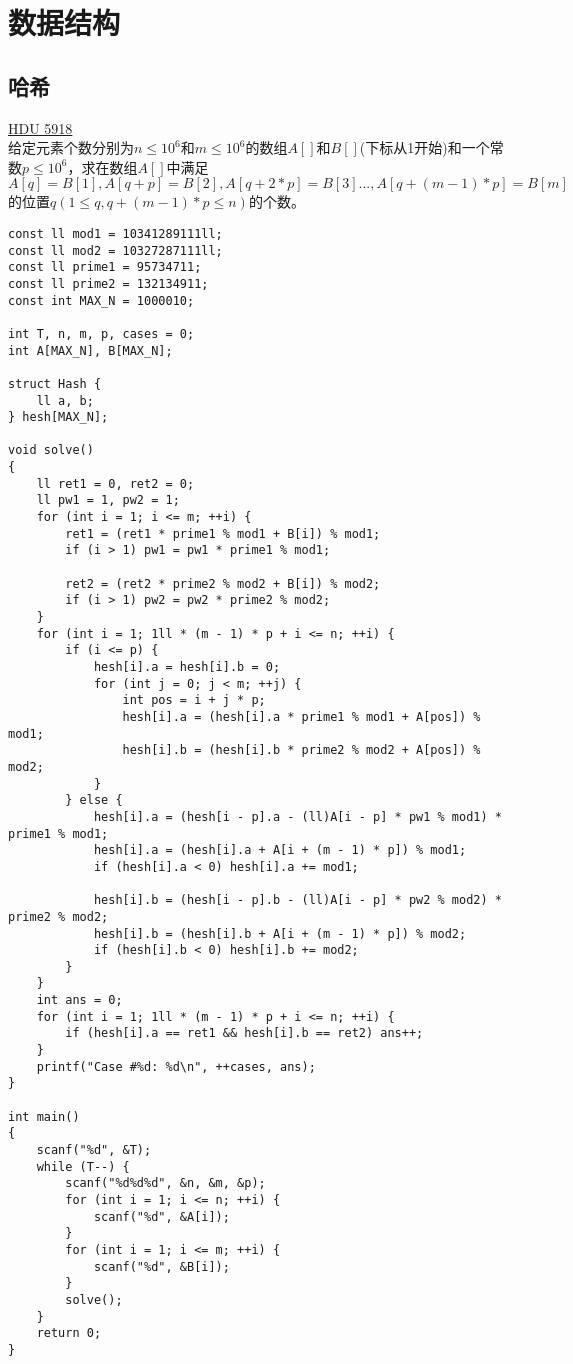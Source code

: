 %
%

\chapter{数据结构}

\section{哈希}

\underline{HDU 5918} \\

给定元素个数分别为$n\leq 10^{6}$和$m\leq 10^{6}$的数组$A[]$和$B[]$(下标从1开始)和一个常数$p\leq 10^{6}$，求在数组$A[]$中满足$A[q]=B[1],A[q+p]=B[2],A[q+2*p]=B[3]...,A[q+(m-1)*p]=B[m]$的位置$q(1\leq q, q+(m-1)*p \leq n)$的个数。

\begin{lstlisting}
const ll mod1 = 10341289111ll;
const ll mod2 = 10327287111ll;
const ll prime1 = 95734711;
const ll prime2 = 132134911;
const int MAX_N = 1000010;

int T, n, m, p, cases = 0;
int A[MAX_N], B[MAX_N];

struct Hash {
	ll a, b;
} hesh[MAX_N];

void solve()
{
	ll ret1 = 0, ret2 = 0;
	ll pw1 = 1, pw2 = 1;
	for (int i = 1; i <= m; ++i) {
		ret1 = (ret1 * prime1 % mod1 + B[i]) % mod1;
		if (i > 1) pw1 = pw1 * prime1 % mod1;

		ret2 = (ret2 * prime2 % mod2 + B[i]) % mod2;
		if (i > 1) pw2 = pw2 * prime2 % mod2;
	}
	for (int i = 1; 1ll * (m - 1) * p + i <= n; ++i) {
		if (i <= p) {
			hesh[i].a = hesh[i].b = 0;
			for (int j = 0; j < m; ++j) {
				int pos = i + j * p;
				hesh[i].a = (hesh[i].a * prime1 % mod1 + A[pos]) % mod1;
				hesh[i].b = (hesh[i].b * prime2 % mod2 + A[pos]) % mod2;
			}
		} else {
			hesh[i].a = (hesh[i - p].a - (ll)A[i - p] * pw1 % mod1) * prime1 % mod1;
			hesh[i].a = (hesh[i].a + A[i + (m - 1) * p]) % mod1;
			if (hesh[i].a < 0) hesh[i].a += mod1;

			hesh[i].b = (hesh[i - p].b - (ll)A[i - p] * pw2 % mod2) * prime2 % mod2;
			hesh[i].b = (hesh[i].b + A[i + (m - 1) * p]) % mod2;
			if (hesh[i].b < 0) hesh[i].b += mod2;
		}
	}
	int ans = 0;
	for (int i = 1; 1ll * (m - 1) * p + i <= n; ++i) {
		if (hesh[i].a == ret1 && hesh[i].b == ret2) ans++;
	}
	printf("Case #%d: %d\n", ++cases, ans);
}

int main()
{
	scanf("%d", &T);
	while (T--) {
		scanf("%d%d%d", &n, &m, &p);
		for (int i = 1; i <= n; ++i) {
			scanf("%d", &A[i]);
		}
		for (int i = 1; i <= m; ++i) {
			scanf("%d", &B[i]);
		}
		solve();
	}
	return 0;
}
\end{lstlisting}


